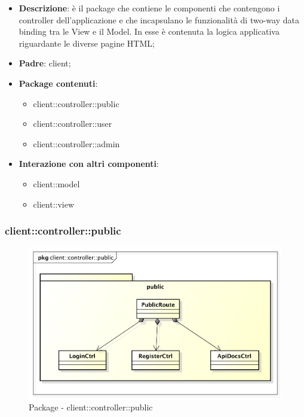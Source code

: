 \begin{itemize}
	\item \textbf{Descrizione}: è il package che contiene le componenti che contengono i controller dell'applicazione e che incapsulano le funzionalità di two-way data binding tra le View e il Model. In esse è contenuta la logica applicativa riguardante le diverse pagine HTML;
	\item \textbf{Padre}: client;
	\item \textbf{Package contenuti}:
		\begin{itemize}
			\item client::controller::public
			\item client::controller::user
			\item client::controller::admin
		\end{itemize}
	\item \textbf{Interazione con altri componenti}:
		\begin{itemize}
			\item client::model
			\item client::view
		\end{itemize}
\end{itemize}


\subsubsection{client::controller::public} %
\label{ssub:bdsm_app_client_controller_public}
\begin{figure}[htbp]
	\centering
	\centerline{\includegraphics[scale=0.6]{./images/client/client_controller_public.pdf}}
	\caption{Package - client::controller::public}
\end{figure}

